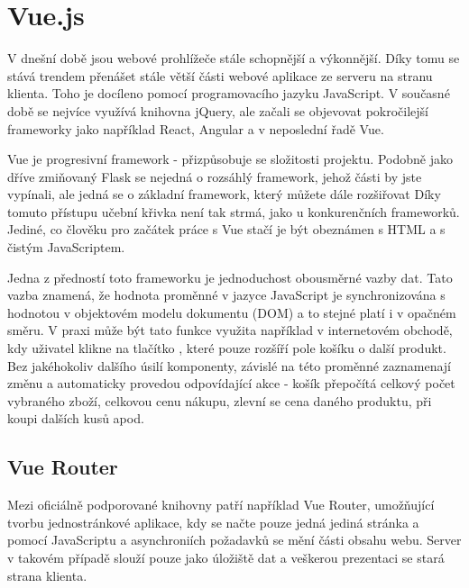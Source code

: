 \section{Vue.js}\label{section:Vue.js}
V dnešní době jsou webové prohlížeče stále schopnější a výkonnější. Díky tomu se stává trendem přenášet stále větší části webové aplikace ze serveru na stranu klienta. Toho je docíleno pomocí programovacího jazyku JavaScript. V současné době se nejvíce využívá knihovna jQuery, %
ale začali se objevovat pokročilejší frameworky jako například React, Angular a v neposlední řadě Vue.

Vue je progresivní framework - přizpůsobuje se složitosti projektu. Podobně jako dříve zmiňovaný Flask se nejedná o rozsáhlý framework, jehož části by jste vypínali, ale jedná se o základní framework, který můžete dále rozšiřovat %
Díky tomuto přístupu učební křivka není tak strmá, jako u konkurenčních frameworků. Jediné, co člověku pro začátek práce s Vue stačí je být obeznámen s HTML a s čistým JavaScriptem.  %

Jedna z předností toto frameworku je jednoduchost obousměrné vazby dat. Tato vazba znamená, že hodnota proměnné v jazyce JavaScript je synchronizována s hodnotou v objektovém modelu dokumentu (DOM) a to stejné platí i v opačném směru. %
V praxi může být tato funkce využita například v internetovém obchodě, kdy uživatel klikne na tlačítko , které pouze rozšíří pole košíku o další produkt. Bez jakéhokoliv dalšího úsilí komponenty, závislé na této proměnné zaznamenají změnu a automaticky provedou odpovídající akce - košík přepočítá celkový počet vybraného zboží, celkovou cenu nákupu, zlevní se cena daného produktu, při koupi dalších kusů apod. 

\subsection{Vue Router}
Mezi oficiálně podporované knihovny patří například Vue Router, umožňující tvorbu jednostránkové aplikace, kdy se načte pouze jedná jediná stránka a pomocí JavaScriptu a asynchroniích požadavků se mění části obsahu webu. Server v takovém případě slouží pouze jako úložiště dat a veškerou prezentaci se stará strana klienta. %

